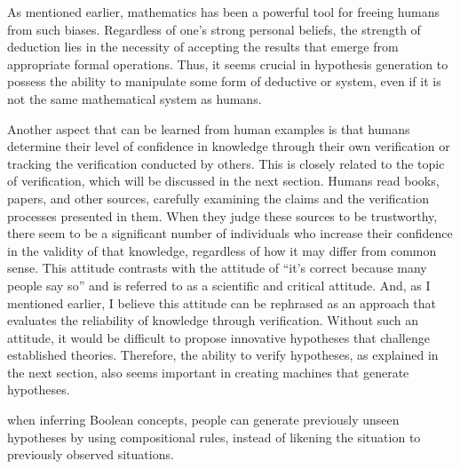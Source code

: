 \documentclass{article}
\begin{document}

As mentioned earlier, mathematics has been a powerful tool for freeing humans from such biases. Regardless of one's strong personal beliefs, the strength of deduction lies in the necessity of accepting the results that emerge from appropriate formal operations. Thus, it seems crucial in hypothesis generation to possess the ability to manipulate some form of deductive or system, even if it is not the same mathematical system as humans.

Another aspect that can be learned from human examples is that humans determine their level of confidence in knowledge through their own verification or tracking the verification conducted by others. This is closely related to the topic of verification, which will be discussed in the next section. Humans read books, papers, and other sources, carefully examining the claims and the verification processes presented in them. When they judge these sources to be trustworthy, there seem to be a significant number of individuals who increase their confidence in the validity of that knowledge, regardless of how it may differ from common sense. This attitude contrasts with the attitude of ``it's correct because many people say so'' and is referred to as a scientific and critical attitude. And, as I mentioned earlier, I believe this attitude can be rephrased as an approach that evaluates the reliability of knowledge through verification. Without such an attitude, it would be difficult to propose innovative hypotheses that challenge established theories. Therefore, the ability to verify hypotheses, as explained in the next section, also seems important in creating machines that generate hypotheses.

when inferring Boolean concepts, people can generate previously unseen hypotheses by using compositional rules, instead of likening the
situation to previously observed situations. \cite{goodman2008rational}
\end{document}
